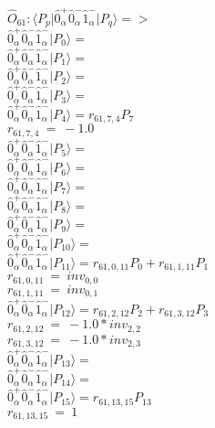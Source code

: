 \documentclass[14pt]{article}
\begin{document}
    $\hat{O}_{61}:  \langle{P_p}\vert \hat{0}_{\alpha}^{+}\hat{0}_{\alpha}^{-}\hat{1}_{\alpha}^{-} \vert{P_q}\rangle => $ \\ 
    $ \hat{0}_{\alpha}^{+}\hat{0}_{\alpha}^{-}\hat{1}_{\alpha}^{-} \vert{P_{0}}\rangle =  $ \\ 
    $ \hat{0}_{\alpha}^{+}\hat{0}_{\alpha}^{-}\hat{1}_{\alpha}^{-} \vert{P_{1}}\rangle =  $ \\ 
    $ \hat{0}_{\alpha}^{+}\hat{0}_{\alpha}^{-}\hat{1}_{\alpha}^{-} \vert{P_{2}}\rangle =  $ \\ 
    $ \hat{0}_{\alpha}^{+}\hat{0}_{\alpha}^{-}\hat{1}_{\alpha}^{-} \vert{P_{3}}\rangle =  $ \\ 
    $ \hat{0}_{\alpha}^{+}\hat{0}_{\alpha}^{-}\hat{1}_{\alpha}^{-} \vert{P_{4}}\rangle = {r}_{61,7,4}P_{7} $ \\ 
    ${r}_{61,7,4}\ =\ -1.0 $ \\ 
    $ \hat{0}_{\alpha}^{+}\hat{0}_{\alpha}^{-}\hat{1}_{\alpha}^{-} \vert{P_{5}}\rangle =  $ \\ 
    $ \hat{0}_{\alpha}^{+}\hat{0}_{\alpha}^{-}\hat{1}_{\alpha}^{-} \vert{P_{6}}\rangle =  $ \\ 
    $ \hat{0}_{\alpha}^{+}\hat{0}_{\alpha}^{-}\hat{1}_{\alpha}^{-} \vert{P_{7}}\rangle =  $ \\ 
    $ \hat{0}_{\alpha}^{+}\hat{0}_{\alpha}^{-}\hat{1}_{\alpha}^{-} \vert{P_{8}}\rangle =  $ \\ 
    $ \hat{0}_{\alpha}^{+}\hat{0}_{\alpha}^{-}\hat{1}_{\alpha}^{-} \vert{P_{9}}\rangle =  $ \\ 
    $ \hat{0}_{\alpha}^{+}\hat{0}_{\alpha}^{-}\hat{1}_{\alpha}^{-} \vert{P_{10}}\rangle =  $ \\ 
    $ \hat{0}_{\alpha}^{+}\hat{0}_{\alpha}^{-}\hat{1}_{\alpha}^{-} \vert{P_{11}}\rangle = {r}_{61,0,11}P_{0}+{r}_{61,1,11}P_{1} $ \\ 
    ${r}_{61,0,11}\ =\ {inv}_{0,0} $ \\ 
    ${r}_{61,1,11}\ =\ {inv}_{0,1} $ \\ 
    $ \hat{0}_{\alpha}^{+}\hat{0}_{\alpha}^{-}\hat{1}_{\alpha}^{-} \vert{P_{12}}\rangle = {r}_{61,2,12}P_{2}+{r}_{61,3,12}P_{3} $ \\ 
    ${r}_{61,2,12}\ =\ -1.0*{inv}_{2,2} $ \\ 
    ${r}_{61,3,12}\ =\ -1.0*{inv}_{2,3} $ \\ 
    $ \hat{0}_{\alpha}^{+}\hat{0}_{\alpha}^{-}\hat{1}_{\alpha}^{-} \vert{P_{13}}\rangle =  $ \\ 
    $ \hat{0}_{\alpha}^{+}\hat{0}_{\alpha}^{-}\hat{1}_{\alpha}^{-} \vert{P_{14}}\rangle =  $ \\ 
    $ \hat{0}_{\alpha}^{+}\hat{0}_{\alpha}^{-}\hat{1}_{\alpha}^{-} \vert{P_{15}}\rangle = {r}_{61,13,15}P_{13} $ \\ 
    ${r}_{61,13,15}\ =\ 1 $ \\ 
    
\end{document}
